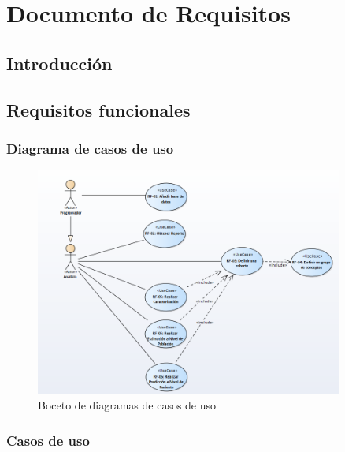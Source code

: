 \chapter{Documento de Requisitos}\label{cap:06requisitos}

\section{Introducción}






\section{Requisitos funcionales}

\subsection{Diagrama de casos de uso}

\begin{figure}[H]
    \centering
    \includegraphics[width=0.90\textwidth]{figures/draftDiagramaCasosUso.png}
    \caption{Boceto de diagramas de casos de uso}
    \label{fig:draftDiagramaCasosUso}
\end{figure}

\subsection{Casos de uso}

